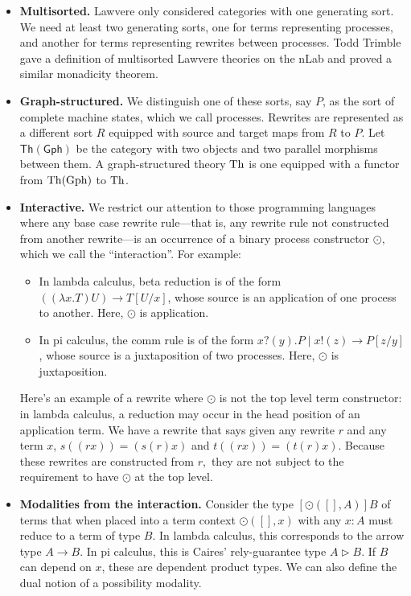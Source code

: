 \documentclass{article}
\begin{document}
\begin{itemize}
    \item {\bf Multisorted.}  Lawvere only considered categories with one generating sort. We need at least two generating sorts, one for terms representing processes, and another for terms representing rewrites between processes. Todd Trimble gave a definition of multisorted Lawvere theories on the nLab
and proved a similar monadicity theorem.

    \item {\bf Graph-structured.}  We distinguish one of these sorts, say $P$, as the sort of complete machine states, which we call processes. Rewrites are represented as a different sort $R$ equipped with source and target maps from $R$ to $P$. Let $\mathsf{Th(Gph)}$ be the category with two objects and two parallel morphisms between them. A graph-structured theory ${\rm Th}$ is one equipped with a functor from ${\rm Th}({\rm Gph})$ to ${\rm Th}$.

    \item {\bf Interactive.}  We restrict our attention to those programming languages where any base case rewrite rule---that is, any rewrite rule not constructed from another rewrite---is an occurrence of a binary process constructor $\odot,$ which we call the ``interaction''.  For example:

\begin{itemize}
    \item In lambda calculus, beta reduction is of the form $((\lambda x.T) U) \to T[U/x]$, whose source is an application of one process to another.  Here, $\odot$ is application.
    \item In pi calculus, the comm rule is of the form $x?(y).P \mid x!(z) \to P[z/y]$, whose source is a juxtaposition of two processes.  Here, $\odot$ is juxtaposition.
\end{itemize}

Here's an example of a rewrite where $\odot$ is not the top level term constructor: in lambda calculus, a reduction may occur in the head position of an application term.  We have a rewrite that says given any rewrite $r$ and any term $x$, $s((r x)) = (s(r) x)$ and $t((r x)) = (t(r) x).$  Because these rewrites are constructed from $r,$ they are not subject to the requirement to have $\odot$ at the top level.

    \item {\bf Modalities from the interaction.}  Consider the type $[\odot([], A)] B$ of terms that when placed into a term context $\odot([], x)$ with any $x\colon A$ must reduce to a term of type $B$. In lambda calculus, this corresponds to the arrow type $A \to B$. In pi calculus, this is Caires' rely-guarantee type $A \triangleright B$.
If $B$ can depend on $x$, these are dependent product types.  We can also define the dual notion of a possibility modality.


\end{itemize}
\end{document}
